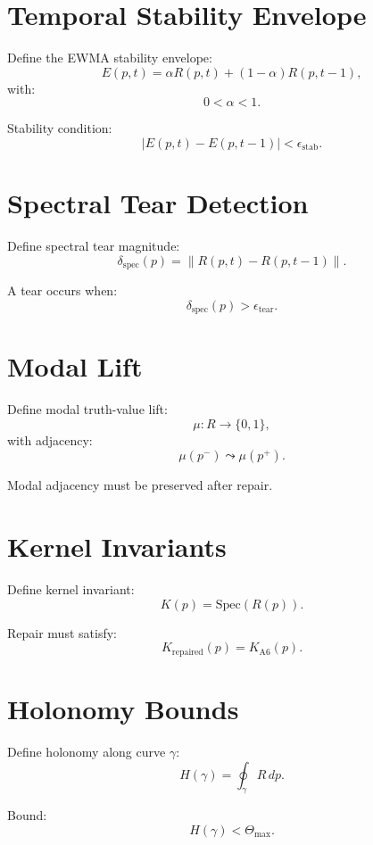 \documentclass[11pt]{article}
\begin{document}
\section{Temporal Stability Envelope}

Define the EWMA stability envelope:
\[
E(p,t) = \alpha R(p,t) + (1-\alpha) R(p,t-1),
\]
with:
\[
0 < \alpha < 1.
\]

Stability condition:
\[
|E(p,t) - E(p,t-1)| < \epsilon_{\mathrm{stab}}.
\]

\section{Spectral Tear Detection}

Define spectral tear magnitude:
\[
\delta_{\mathrm{spec}}(p)
  = \| R(p,t) - R(p,t-1) \|.
\]

A tear occurs when:
\[
\delta_{\mathrm{spec}}(p) > \epsilon_{\mathrm{tear}}.
\]

\section{Modal Lift}

Define modal truth-value lift:
\[
\mu : R \to \{0,1\},
\]
with adjacency:
\[
\mu(p^-) \leadsto \mu(p^+).
\]

Modal adjacency must be preserved after repair.

\section{Kernel Invariants}

Define kernel invariant:
\[
K(p) = \mathrm{Spec}(R(p)).
\]

Repair must satisfy:
\[
K_{\mathrm{repaired}}(p) = K_{\mathrm{A6}}(p).
\]

\section{Holonomy Bounds}

Define holonomy along curve $\gamma$:
\[
H(\gamma) = \oint_\gamma R \, dp.
\]

Bound:
\[
H(\gamma) < \Theta_{\max}.
\]

\end{document}

